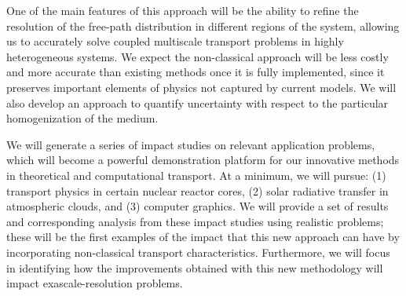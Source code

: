 \documentclass[12pt]{article}
\begin{document}
One of the main features of this approach will be the ability to refine the resolution of the free-path distribution in different regions of the system, allowing us to accurately solve coupled multiscale transport problems in highly heterogeneous systems.
We expect the non-classical approach will be less costly and more accurate than existing methods once it is fully implemented, since it preserves important elements of physics not captured by current models.
We will also develop an approach to quantify uncertainty with respect to the particular homogenization of the medium.

We will generate a series of impact studies on relevant application problems, which will become a powerful demonstration platform for our innovative methods in theoretical and computational transport.
At a minimum, we will pursue: (1) transport physics in certain nuclear reactor cores, (2) solar radiative transfer in atmospheric clouds, and (3) computer
graphics.
We will provide a set of results and corresponding analysis from these impact studies using realistic problems; these will be the first examples of the impact that this new approach can have by incorporating non-classical transport characteristics.
Furthermore, we will focus in identifying how the improvements obtained with this new methodology will impact exascale-resolution problems.
\end{document}
